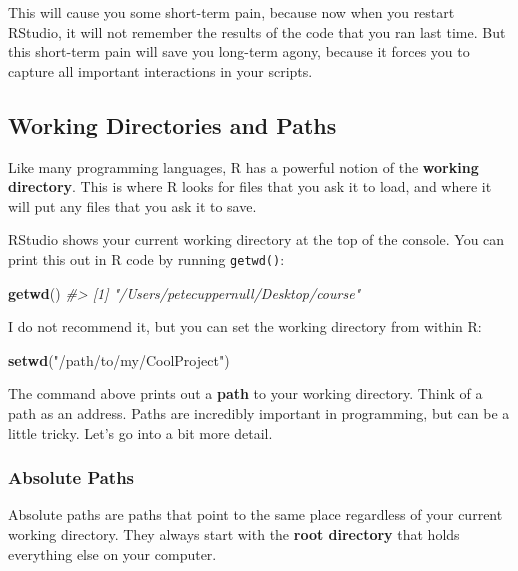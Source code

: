 \documentclass[]{book}
\newenvironment{Shaded}{\begin{snugshade}}{\end{snugshade}}
\newcommand{\KeywordTok}[1]{\textcolor[rgb]{0.13,0.29,0.53}{\textbf{#1}}}
\newcommand{\StringTok}[1]{\textcolor[rgb]{0.31,0.60,0.02}{#1}}
\newcommand{\CommentTok}[1]{\textcolor[rgb]{0.56,0.35,0.01}{\textit{#1}}}
\newcommand{\NormalTok}[1]{#1}
\begin{document}
This will cause you some short-term pain, because now when you restart
RStudio, it will not remember the results of the code that you ran last
time. But this short-term pain will save you long-term agony, because it
forces you to capture all important interactions in your scripts.

\subsection{Working Directories and
Paths}\label{working-directories-and-paths}

Like many programming languages, R has a powerful notion of the
\textbf{working directory}. This is where R looks for files that you ask
it to load, and where it will put any files that you ask it to save.

RStudio shows your current working directory at the top of the console.
You can print this out in R code by running \texttt{getwd()}:

\begin{Shaded}
\begin{Highlighting}[]
\KeywordTok{getwd}\NormalTok{()}
\CommentTok{#> [1] "/Users/petecuppernull/Desktop/course"}
\end{Highlighting}
\end{Shaded}

I do not recommend it, but you can set the working directory from within
R:

\begin{Shaded}
\begin{Highlighting}[]
\KeywordTok{setwd}\NormalTok{(}\StringTok{"/path/to/my/CoolProject"}\NormalTok{)}
\end{Highlighting}
\end{Shaded}

The command above prints out a \textbf{path} to your working directory.
Think of a path as an address. Paths are incredibly important in
programming, but can be a little tricky. Let's go into a bit more
detail.

\subsubsection*{Absolute Paths}\label{absolute-paths}

Absolute paths are paths that point to the same place regardless of your
current working directory. They always start with the \textbf{root
directory} that holds everything else on your computer.
\end{document}

